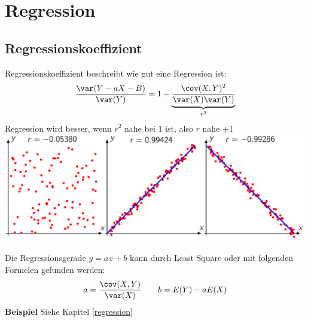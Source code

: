 \section{Regression}
\subsection{Regressionskoeffizient}
Regressionskoeffizient beschreibt wie gut eine Regression ist:
\[
\frac{\var(Y-aX-B)}{\var(Y)} = 1 - \underbrace{\frac{\cov(X, Y)^2}{\var(X)\var(Y)}}_{r^2}
\]
Regression wird besser, wenn $r^2$ nahe bei $1$ ist, also $r$ nahe $\pm 1$~\\
\includegraphics[width=0.9\linewidth]{Images/regressionskoeffizient}

Die Regressionsgerade $y = ax + b$ kann durch Least Square oder mit folgenden Formelen gefunden werden:
\[
a = \frac{\cov(X, Y)}{\var(X)} \qquad b = E(Y) - aE(X)
\]
\noindent\textbf{Beispiel} Siehe Kapitel \ref{regression}

